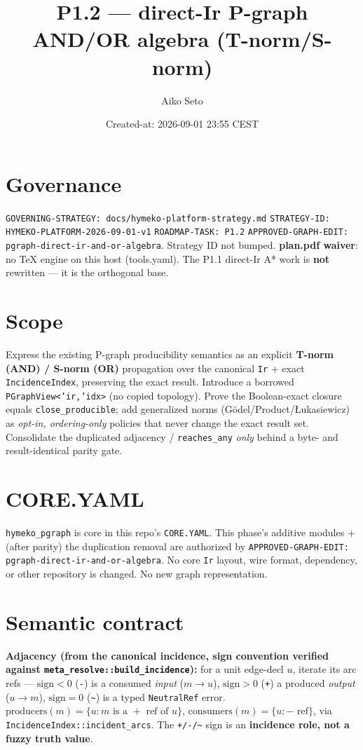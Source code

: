 \documentclass[11pt]{article}
\title{P1.2 --- direct-Ir P-graph AND/OR algebra (T-norm/S-norm)}\author{Aiko Seto}
\date{Created-at: 2026-09-01 23:55 CEST}
\begin{document}
\maketitle

\section*{Governance}
\texttt{GOVERNING-STRATEGY: docs/hymeko-platform-strategy.md} \textperiodcentered{}
\texttt{STRATEGY-ID: HYMEKO-PLATFORM-2026-09-01-v1} \textperiodcentered{} \texttt{ROADMAP-TASK: P1.2}
\textperiodcentered{} \texttt{APPROVED-GRAPH-EDIT: pgraph-direct-ir-and-or-algebra}. Strategy ID not
bumped. \textbf{plan.pdf waiver}: no TeX engine on this host (tools.yaml). The P1.1 direct-Ir A* work is
\textbf{not} rewritten --- it is the orthogonal base.

\section*{Scope}
Express the existing P-graph producibility semantics as an explicit \textbf{T-norm (AND) / S-norm (OR)}
propagation over the canonical \texttt{Ir} + exact \texttt{IncidenceIndex}, preserving the exact result.
Introduce a borrowed \texttt{PGraphView<'ir,'idx>} (no copied topology). Prove the Boolean-exact closure
equals \texttt{close\_producible}; add generalized norms (G\"odel/Product/\L{}ukasiewicz) as \emph{opt-in,
ordering-only} policies that never change the exact result set. Consolidate the duplicated adjacency /
\texttt{reaches\_any} \emph{only} behind a byte- and result-identical parity gate.

\section*{CORE.YAML}
\texttt{hymeko\_pgraph} is core in this repo's \texttt{CORE.YAML}. This phase's additive modules + (after
parity) the duplication removal are authorized by \texttt{APPROVED-GRAPH-EDIT:
pgraph-direct-ir-and-or-algebra}. No core \texttt{Ir} layout, wire format, dependency, or other repository
is changed. No new graph representation.

\section*{Semantic contract}
\textbf{Adjacency (from the canonical incidence, sign convention verified against
\texttt{meta\_resolve::build\_incidence}):} for a unit edge-decl $u$, iterate its arc refs ---
$\text{sign}<0$ (\texttt{-}) is a consumed \emph{input} ($m\to u$), $\text{sign}>0$ (\texttt{+}) a produced
\emph{output} ($u\to m$), $\text{sign}=0$ (\texttt{\~{}}) is a typed \texttt{NeutralRef} error.
$\text{producers}(m)=\{u:\text{$m$ is a }+\text{ ref of }u\}$, $\text{consumers}(m)=\{u:\text{$-$ ref}\}$,
via \texttt{IncidenceIndex::incident\_arcs}. The \texttt{+/-/\~{}} sign is an \textbf{incidence role, not a
fuzzy truth value}.
\end{document}
